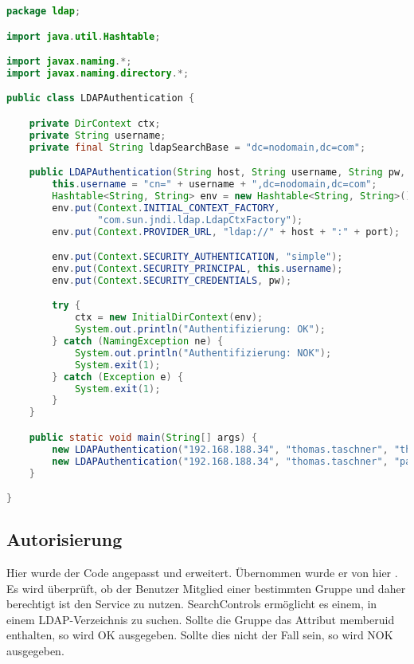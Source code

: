 \begin{lstlisting}[frame=single, language=java, caption=Java Code zur LDAP Authentifizierung]
package ldap;

import java.util.Hashtable;

import javax.naming.*;
import javax.naming.directory.*;

public class LDAPAuthentication {

	private DirContext ctx;
	private String username;
	private final String ldapSearchBase = "dc=nodomain,dc=com";

	public LDAPAuthentication(String host, String username, String pw, int port) {
		this.username = "cn=" + username + ",dc=nodomain,dc=com";
		Hashtable<String, String> env = new Hashtable<String, String>();
		env.put(Context.INITIAL_CONTEXT_FACTORY,
				"com.sun.jndi.ldap.LdapCtxFactory");
		env.put(Context.PROVIDER_URL, "ldap://" + host + ":" + port);

		env.put(Context.SECURITY_AUTHENTICATION, "simple");
		env.put(Context.SECURITY_PRINCIPAL, this.username);
		env.put(Context.SECURITY_CREDENTIALS, pw);

		try {
			ctx = new InitialDirContext(env);
			System.out.println("Authentifizierung: OK");
		} catch (NamingException ne) {
			System.out.println("Authentifizierung: NOK");
			System.exit(1);
		} catch (Exception e) {
			System.exit(1);
		}
	}

	public static void main(String[] args) {
		new LDAPAuthentication("192.168.188.34", "thomas.taschner", "thomas.taschner", 389);
		new LDAPAuthentication("192.168.188.34", "thomas.taschner", "passwort123", 389);
	}

}
\end{lstlisting}

\subsection{Autorisierung}
\label{sec:Autorisierung}
Hier wurde der Code angepasst und erweitert. Übernommen wurde er von hier
\cite{StackoverflowAuthenticate}
\cite{LDAP-CLT}
.
Es wird überprüft, ob der Benutzer Mitglied einer bestimmten Gruppe und daher berechtigt ist den Service zu nutzen. SearchControls ermöglicht es einem, in einem LDAP-Verzeichnis zu suchen. Sollte die Gruppe das Attribut memberuid enthalten, so wird OK ausgegeben. Sollte dies nicht der Fall sein, so wird NOK ausgegeben.

